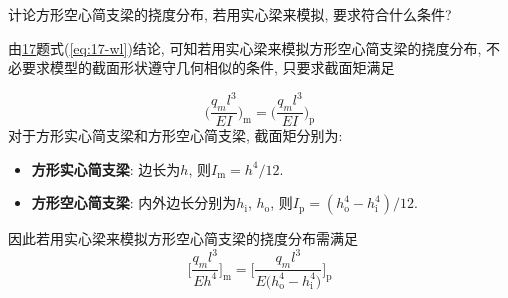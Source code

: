 \begin{problem}[19]
计论方形空心简支梁的挠度分布, 若用实心梁来模拟, 要求符合什么条件?
\end{problem}
\begin{solution}
\begin{minipage}[c]{0.7\linewidth}
由\hyperref[problem:17]{17}题式(\ref{eq:17-wl})结论, 可知若用实心梁来模拟方形空心简支梁的挠度分布, 不必要求模型的截面形状遵守几何相似的条件, 只要求截面矩满足
\end{minipage}
\begin{minipage}[c]{0.3\linewidth}
\begin{center}

\end{center}
\end{minipage}
\[
\bigg(\frac{q_ml^3}{EI}\bigg)_\mathrm{m} = \bigg(\frac{q_ml^3}{EI}\bigg)_\mathrm{p}
\]
对于方形实心简支梁和方形空心简支梁, 截面矩分别为:
\begin{itemize}
\item \textbf{方形实心简支梁}: 边长为$h$, 则$I_\mathrm{m} = h^4/12$.
\item \textbf{方形空心简支梁}: 内外边长分别为$h_\mathrm{i}$, $h_\mathrm{o}$, 则$I_\mathrm{p}=(h_\mathrm{o}^4-h_\mathrm{i}^4)/12$.
\end{itemize}
因此若用实心梁来模拟方形空心简支梁的挠度分布需满足
\[
\Bigg[\frac{q_ml^3}{Eh^4}\Bigg]_\mathrm{m} = \Bigg[\frac{q_ml^3}{E\big(h_\mathrm{o}^4-h_\mathrm{i}^4\big)}\Bigg]_\mathrm{p}
\]
\end{solution}
\label{problem:19}
